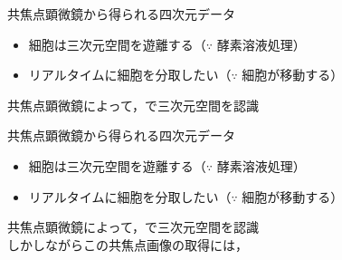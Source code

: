 \begin{frame}{共焦点顕微鏡から得られる四次元データ}
    \begin{itemize}
        \item 細胞は三次元空間を遊離する（$\because$ 酵素溶液処理）
        \item リアルタイムに細胞を分取したい（$\because$ 細胞が移動する）
    \end{itemize}
    \ra 共焦点顕微鏡によって，で三次元空間を認識
    \\
\end{frame}
\begin{frame}[noframenumbering]{共焦点顕微鏡から得られる四次元データ}
    \begin{itemize}
        \item 細胞は三次元空間を遊離する（$\because$ 酵素溶液処理）
        \item リアルタイムに細胞を分取したい（$\because$ 細胞が移動する）
    \end{itemize}
    \ra 共焦点顕微鏡によって，で三次元空間を認識
    \\\ra しかしながらこの共焦点画像の取得には，
\end{frame}

